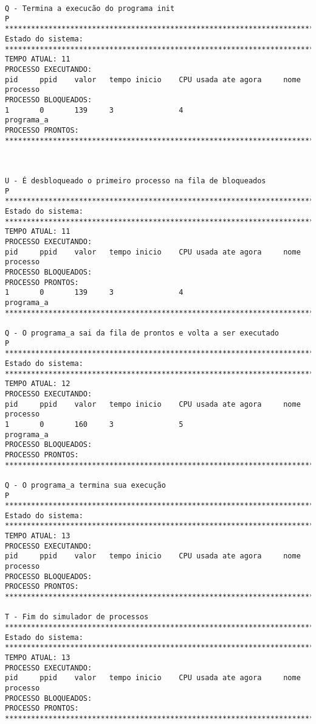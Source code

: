 \documentclass[a4paper, 12pt]{article}
\begin{document}
\begin{footnotesize}
\begin{verbatim}
Q - Termina a execucão do programa init
P
*****************************************************************************
Estado do sistema:
*****************************************************************************
TEMPO ATUAL: 11
PROCESSO EXECUTANDO:
pid     ppid    valor   tempo inicio    CPU usada ate agora     nome processo
PROCESSO BLOQUEADOS:
1       0       139     3               4                       programa_a
PROCESSO PRONTOS:
*****************************************************************************



U - É desbloqueado o primeiro processo na fila de bloqueados
P
*****************************************************************************
Estado do sistema:
*****************************************************************************
TEMPO ATUAL: 11
PROCESSO EXECUTANDO:
pid     ppid    valor   tempo inicio    CPU usada ate agora     nome processo
PROCESSO BLOQUEADOS:
PROCESSO PRONTOS:
1       0       139     3               4                       programa_a
*****************************************************************************

Q - O programa_a sai da fila de prontos e volta a ser executado
P
*****************************************************************************
Estado do sistema:
*****************************************************************************
TEMPO ATUAL: 12
PROCESSO EXECUTANDO:
pid     ppid    valor   tempo inicio    CPU usada ate agora     nome processo
1       0       160     3               5                       programa_a
PROCESSO BLOQUEADOS:
PROCESSO PRONTOS:
*****************************************************************************

Q - O programa_a termina sua execução 
P
*****************************************************************************
Estado do sistema:
*****************************************************************************
TEMPO ATUAL: 13
PROCESSO EXECUTANDO:
pid     ppid    valor   tempo inicio    CPU usada ate agora     nome processo
PROCESSO BLOQUEADOS:
PROCESSO PRONTOS:
*****************************************************************************

T - Fim do simulador de processos
*****************************************************************************
Estado do sistema:
*****************************************************************************
TEMPO ATUAL: 13
PROCESSO EXECUTANDO:
pid     ppid    valor   tempo inicio    CPU usada ate agora     nome processo
PROCESSO BLOQUEADOS:
PROCESSO PRONTOS:
*****************************************************************************
\end{verbatim}
\end{footnotesize}
\newpage
\end{document}
